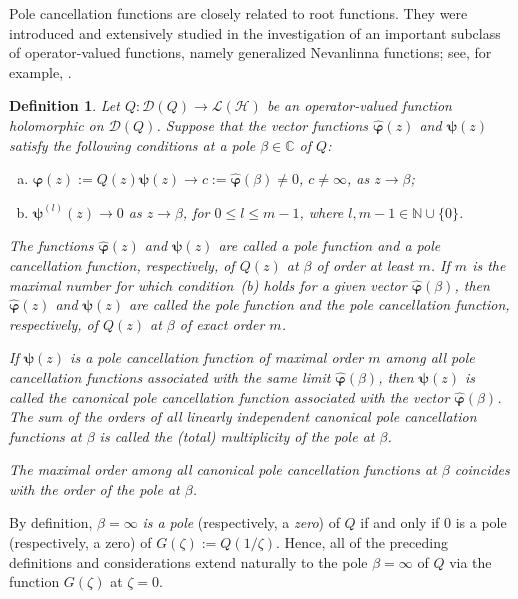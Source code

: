 \documentclass[11pt, reqno]{amsart}
\theoremstyle{plain}
\newtheorem{defi}{Definition}[section]
\theoremstyle{remark}
\numberwithin{equation}{section}
\begin{document}
Pole cancellation functions are closely related to root functions. They were introduced and extensively studied in the investigation of an important subclass of operator-valued functions, namely generalized Nevanlinna functions; see, for example, \cite{DLS, BLu}.
\begin{defi}\label{definition24}
Let $Q : \mathcal{D}(Q) \rightarrow \mathcal{L}(\mathcal{H})$ be an operator-valued function holomorphic on $\mathcal{D}(Q)$. Suppose that the vector functions $\boldsymbol{\hat{\varphi}}(z)$ and $\boldsymbol{\psi}(z)$ satisfy the following conditions at a pole $\beta \in \mathbb{C}$ of $Q$:
\begin{enumerate}[(a)]
\item $\boldsymbol{\hat{\varphi}}(z) := Q(z)\boldsymbol{\psi}(z) \to c := \boldsymbol{\hat{\varphi}}(\beta) \ne 0$, $c \ne \infty$, as $z \to \beta$;
\item $\boldsymbol{\psi}^{(l)}(z) \to 0$ as $z \to \beta$, for $0 \le l \le m-1$, where $l, m-1 \in \mathbb{N} \cup \{0\}$.
\end{enumerate}
The functions $\boldsymbol{\hat{\varphi}}(z)$ and $\boldsymbol{\psi}(z)$ are called a \textit{pole function} and a \textit{pole cancellation function}, respectively, of $Q(z)$ at $\beta$ of order at least $m$. If $m$ is the maximal number for which condition~(b) holds for a given vector $\boldsymbol{\hat{\varphi}}(\beta)$, then $\boldsymbol{\hat{\varphi}}(z)$ and $\boldsymbol{\psi}(z)$ are called the \textit{pole function} and the \textit{pole cancellation function}, respectively, of $Q(z)$ at $\beta$ of \textit{exact order} $m$.

If $\boldsymbol{\psi}(z)$ is a pole cancellation function of maximal order $m$ among all pole cancellation functions associated with the same limit $\boldsymbol{\hat{\varphi}}(\beta)$, then $\boldsymbol{\psi}(z)$ is called the \textit{canonical pole cancellation function} associated with the vector $\boldsymbol{\hat{\varphi}}(\beta)$. The sum of the orders of all linearly independent canonical pole cancellation functions at $\beta$ is called the (total) multiplicity of the pole at $\beta$.

The maximal order among all canonical pole cancellation functions at $\beta$ coincides with the \textit{order of the pole} at $\beta$.
\end{defi}

By definition, $\beta = \infty$ \textit{is a pole} (respectively, a \textit{zero}) of $Q$ if and only if $0$ is a pole (respectively, a zero) of $G(\zeta) := Q(1/\zeta)$. Hence, all of the preceding definitions and considerations extend naturally to the pole $\beta = \infty$ of $Q$ via the function $G(\zeta)$ at $\zeta = 0$.
\end{document}
